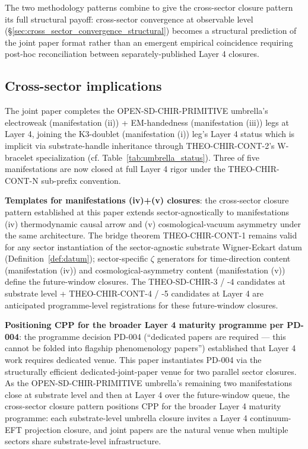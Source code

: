 \documentclass[11pt,letterpaper]{article}
\begin{document}
The two methodology patterns combine to give the cross-sector closure pattern its full structural payoff: cross-sector convergence at observable level (§\ref{sec:cross_sector_convergence_structural}) becomes a structural prediction of the joint paper format rather than an emergent empirical coincidence requiring post-hoc reconciliation between separately-published Layer 4 closures.

\subsection{Cross-sector implications}
\label{sec:cross_sector_implications}

The joint paper completes the OPEN-SD-CHIR-PRIMITIVE umbrella's electroweak (manifestation (ii)) + EM-handedness (manifestation (iii)) legs at Layer 4, joining the K3-doublet (manifestation (i)) leg's Layer 4 status which is implicit via substrate-handle inheritance through THEO-CHIR-CONT-2's W-bracelet specialization (cf. Table~\ref{tab:umbrella_status}). Three of five manifestations are now closed at full Layer 4 rigor under the THEO-CHIR-CONT-N sub-prefix convention.

\textbf{Templates for manifestations (iv)+(v) closures}: the cross-sector closure pattern established at this paper extends sector-agnostically to manifestations (iv) thermodynamic causal arrow and (v) cosmological-vacuum asymmetry under the same architecture. The bridge theorem THEO-CHIR-CONT-1 remains valid for any sector instantiation of the sector-agnostic substrate Wigner-Eckart datum (Definition~\ref{def:datum}); sector-specific $\zeta$ generators for time-direction content (manifestation (iv)) and cosmological-asymmetry content (manifestation (v)) define the future-window closures. The THEO-SD-CHIR-3 / -4 candidates at substrate level + THEO-CHIR-CONT-4 / -5 candidates at Layer 4 are anticipated programme-level registrations for these future-window closures.

\textbf{Positioning CPP for the broader Layer 4 maturity programme per PD-004}: the programme decision PD-004 \cite{ResearchFrontier} (``dedicated papers are required --- this cannot be folded into flagship phenomenology papers'') established that Layer 4 work requires dedicated venue. This paper instantiates PD-004 via the structurally efficient dedicated-joint-paper venue for two parallel sector closures. As the OPEN-SD-CHIR-PRIMITIVE umbrella's remaining two manifestations close at substrate level and then at Layer 4 over the future-window queue, the cross-sector closure pattern positions CPP for the broader Layer 4 maturity programme: each substrate-level umbrella closure invites a Layer 4 continuum-EFT projection closure, and joint papers are the natural venue when multiple sectors share substrate-level infrastructure.
\end{document}
